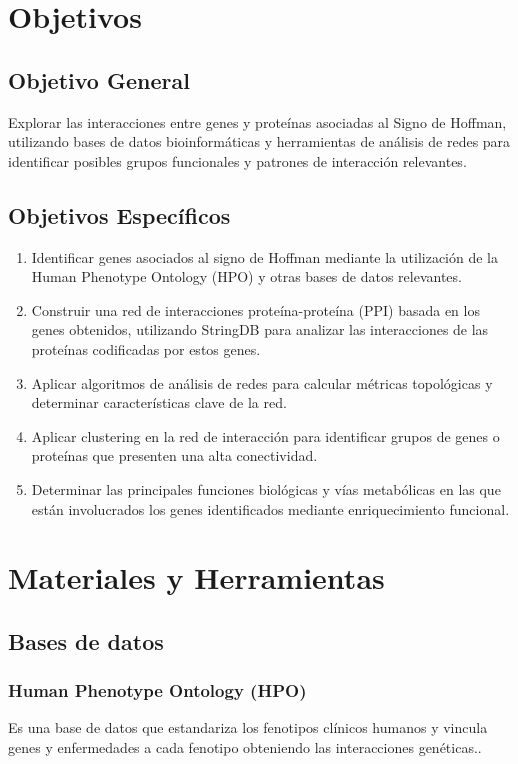 \section{Objetivos}
\subsection{Objetivo General}

Explorar las interacciones entre genes y proteínas asociadas al Signo de Hoffman, utilizando bases de datos bioinformáticas y herramientas de análisis de redes para identificar posibles grupos funcionales y patrones de interacción relevantes.

\subsection{Objetivos Específicos}
\begin{enumerate}
	\item Identificar genes asociados al signo de Hoffman mediante la utilización de la Human Phenotype Ontology (HPO) y otras bases de datos relevantes.
	\item Construir una red de interacciones proteína-proteína (PPI) basada en los genes obtenidos, utilizando StringDB para analizar las interacciones de las proteínas codificadas por estos genes.
	\item Aplicar algoritmos de análisis de redes para calcular métricas topológicas y determinar características clave de la red.
	\item Aplicar clustering en la red de interacción para identificar grupos de genes o proteínas que presenten una alta conectividad.
	\item Determinar las principales funciones biológicas y vías metabólicas en las que están involucrados los genes identificados mediante enriquecimiento funcional.
\end{enumerate}

\section{Materiales y Herramientas}

\subsection{Bases de datos}

\subsubsection{Human Phenotype Ontology (HPO)}
  Es una base de datos que estandariza los fenotipos clínicos humanos y vincula genes y enfermedades a cada fenotipo obteniendo las interacciones genéticas.\cite{gargano2024}. 
